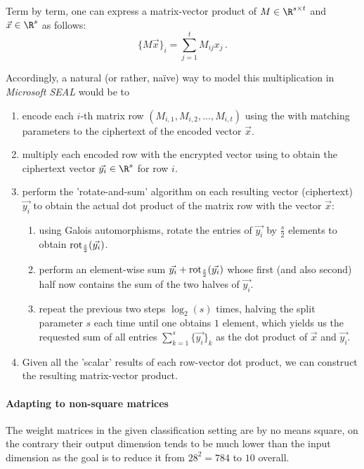 Term by term, one can express a matrix-vector product of $M \in \R^{s \times t}$ and
$\vec{x} \in \R^s$ as follows:
$$\{M \vec{x}\}_i = \sum_{j=1}^{t} M_{ij} x_j \,.$$

Accordingly, a natural (or rather, naïve) way to model this multiplication in \textit{Microsoft SEAL} would be to
\begin{enumerate}
  \item encode each $i$-th matrix row $(M_{i,1}, M_{i,2}, ..., M_{i,t})$ using the 
        with matching parameters to the ciphertext of the encoded vector $\vec{x}$.
  \item multiply each encoded row with the encrypted vector using 
        to obtain the ciphertext vector $\vec{y_i} \in \R^s$ for row $i$.
  \item perform the 'rotate-and-sum' algorithm \parencite{2018-gazelle} on each
        resulting vector (ciphertext) $\vec{y_i}$ to obtain the actual dot product
        of the matrix row with the vector $\vec{x}$:
        \begin{enumerate}
          \item using Galois automorphisms, rotate the entries of $\vec{y_i}$ by $\frac{s}{2}$ elements
                to obtain $\mathrm{rot}_{\frac{s}{2}}(\vec{y_i})$.
          \item perform an element-wise sum $\vec{y_i} + \mathrm{rot}_{\frac{s}{2}}(\vec{y_i})$
                whose first (and also second) half now contains the sum of the two halves of $\vec{y_i}$.
          \item repeat the previous two steps $\log_2(s)$ times, halving the
                split parameter $s$ each time until one obtains $1$ element,
                which yields us the requested sum of all entries $\sum_{k=1}^s \{\vec{y_i}\}_k$
                as the dot product of $\vec{x}$ and $\vec{y_i}$.
        \end{enumerate}
  \item Given all the 'scalar' results of each row-vector dot product,
        we can construct the resulting matrix-vector product.
\end{enumerate}

\paragraph{Adapting to non-square matrices}
\label{subsec:non-square-matrices}
The weight matrices in the given classification setting are by no means square, on the contrary their output dimension tends to be much lower than the input dimension as the goal is to reduce it from $28^2 = 784$ to $10$ overall.

